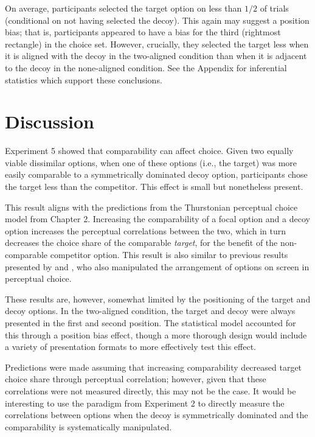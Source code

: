 On average, participants selected the target option on less than $1/2$ of trials (conditional on not having selected the decoy). This again may suggest a position bias; that is, participants appeared to have a bias for the third (rightmost rectangle) in the choice set. However, crucially, they selected the target less when it is aligned with the decoy in the two-aligned condition than when it is adjacent to the decoy in the none-aligned condition. See the Appendix for inferential statistics which support these conclusions.

\section{Discussion}

Experiment 5 showed that comparability can affect choice. Given two equally viable dissimilar options, when one of these options (i.e., the target) was more easily comparable to a symmetrically dominated decoy option, participants chose the target less than the competitor. This effect is small but nonetheless present.

This result aligns with the predictions from the Thurstonian perceptual choice model from Chapter 2. Increasing the comparability of a focal option and a decoy option increases the perceptual correlations between the two, which in turn decreases the choice share of the comparable \textit{target}, for the benefit of the non-comparable competitor option. This result is also similar to previous results presented by \textcite{trueblood2022attentional} and \textcite{evansImpactPresentationOrder2021}, who also manipulated the arrangement of options on screen in perceptual choice.

These results are, however, somewhat limited by the positioning of the target and decoy options. In the two-aligned condition, the target and decoy were always presented in the first and second position. The statistical model accounted for this through a position bias effect, though a more thorough design would include a variety of presentation formats to more effectively test this effect.

Predictions were made assuming that increasing comparability decreased target choice share through perceptual correlation; however, given that these correlations were not measured directly, this may not be the case. It would be interesting to use the paradigm from Experiment 2 to directly measure the correlations between options when the decoy is symmetrically dominated and the comparability is systematically manipulated.

